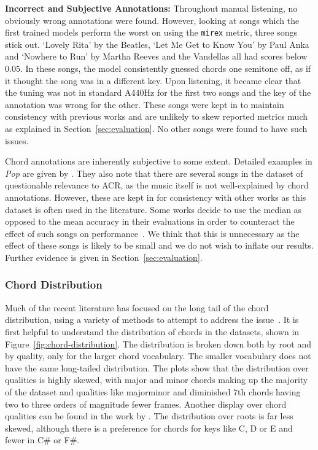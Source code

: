 \textbf{Incorrect and Subjective Annotations:} Throughout manual listening, no obviously wrong annotations were found. However, looking at songs which the first trained models perform the worst on using the \texttt{mirex} metric, three songs stick out. `Lovely Rita' by the Beatles, `Let Me Get to Know You' by Paul Anka and `Nowhere to Run' by Martha Reeves and the Vandellas all had scores below $0.05$. In these songs, the model consistently guessed chords one semitone off, as if it thought the song was in a different key. Upon listening, it became clear that the tuning was not in standard A440Hz for the first two songs and the key of the annotation was wrong for the other. These songs were kept in to maintain consistency with previous works and are unlikely to skew reported metrics much as explained in Section~\ref{sec:evaluation}. No other songs were found to have such issues.

Chord annotations are inherently subjective to some extent. Detailed examples in \emph{Pop} are given by \citet{FourTimelyInsights}. They also note that there are several songs in the dataset of questionable relevance to ACR, as the music itself is not well-explained by chord annotations. However, these are kept in for consistency with other works as this dataset is often used in the literature. Some works decide to use the median as opposed to the mean accuracy in their evaluations in order to counteract the effect of such songs on performance~\citep{StructuredTraining}. We think that this is unnecessary as the effect of these songs is likely to be small and we do not wish to inflate our results. Further evidence is given in Section~\ref{sec:evaluation}.

\subsubsection{Chord Distribution}

Much of the recent literature has focused on the long tail of the chord distribution, using a variety of methods to attempt to address the issue~\citep{BalanceRandomForestACR,CurriculumLearning}. It is first helpful to understand the distribution of chords in the datasets, shown in Figure~\ref{fig:chord-distribution}. The distribution is broken down both by root and by quality, only for the larger chord vocabulary. The smaller vocabulary does not have the same long-tailed distribution. The plots show that the distribution over qualities is highly skewed, with major and minor chords making up the majority of the dataset and qualities like majorminor and diminished 7th chords having two to three orders of magnitude fewer frames. Another display over chord qualities can be found in the work by \citet{ACRLargeVocab1}. The distribution over roots is far less skewed, although there is a preference for chords for keys like C, D or E and fewer in C\# or F\#.

